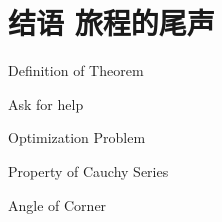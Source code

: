 \chapter*{ 结语 \quad 旅程的尾声}
 \begin{introduction}
  \item Definition of Theorem
  \item Ask for help
  \item Optimization Problem
  \item Property of Cauchy Series
  \item Angle of Corner
\end{introduction}


